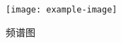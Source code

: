 \begin{figure}[ht]
    \centering
    \texttt{[image: example-image]}
    \caption{频谱图}
\end{figure}